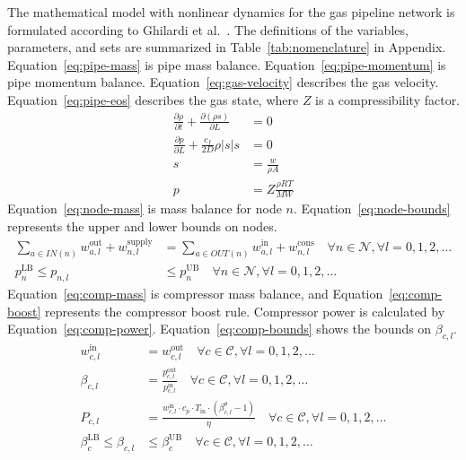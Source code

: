 \documentclass[11pt]{article}
\begin{document}
The mathematical model with nonlinear dynamics for the gas pipeline network is formulated according to Ghilardi et al.~\cite{GHILARDI2024}. The definitions of the variables, parameters, and sets are summarized in Table~\ref{tab:nomenclature} in Appendix. Equation~\eqref{eq:pipe-mass} is pipe mass balance. Equation~\eqref{eq:pipe-momentum} is pipe momentum balance. Equation~\eqref{eq:gas-velocity} describes the gas velocity. Equation~\eqref{eq:pipe-eos} describes the gas state, where $Z$ is a compressibility factor.
\begin{align}
\frac{\partial \rho}{\partial t} + \frac{\partial(\rho s)}{\partial L} &= 0 \label{eq:pipe-mass} \\
\frac{\partial p}{\partial L} + \frac{c_f}{2D}\rho|s|s &= 0 \label{eq:pipe-momentum} \\
s &= \frac{w}{\rho A} \label{eq:gas-velocity}\\
p &= Z\frac{\rho RT}{MW} \label{eq:pipe-eos}
\end{align}
Equation~\eqref{eq:node-mass} is mass balance for node $n$. Equation~\eqref{eq:node-bounds} represents the upper and lower bounds on nodes.
\begin{align}
\sum_{a \in IN(n)} w_{a,l}^{\text{out}} + w_{n,l}^{\text{supply}} &= \sum_{a \in OUT(n)} w_{a,l}^{\text{in}} + w_{n,l}^{\text{cons}}
\quad \forall n \in \mathcal{N}, \forall l = 0,1,2,\dots \label{eq:node-mass} \\
p_n^{\text{LB}} \leq p_{n,l} &\leq p_n^{\text{UB}} \quad \forall n \in \mathcal{N}, \forall l = 0,1,2,\dots \label{eq:node-bounds}
\end{align}
Equation~\eqref{eq:comp-mass} is compressor mass balance, and Equation~\eqref{eq:comp-boost} represents the compressor boost rule. Compressor power is calculated by Equation~\eqref{eq:comp-power}. Equation~\eqref{eq:comp-bounds} shows the bounds on $\beta_{c,l}$.
\begin{align}
w_{c,l}^{\text{in}} &= w_{c,l}^{\text{out}} \quad \forall c \in \mathcal{C}, \forall l = 0,1,2,\dots \label{eq:comp-mass} \\
\beta_{c,l} &= \frac{p_{c,l}^{\text{out}}}{p_{c,l}^{\text{in}}} \quad \forall c \in \mathcal{C}, \forall l = 0,1,2,\dots \label{eq:comp-boost} \\
P_{c,l} &= \frac{w_{c,l}^{\text{in}} \cdot c_p \cdot T_{\text{in}} \cdot (\beta_{c,l}^{\theta} - 1)}{\eta} \quad \forall c \in \mathcal{C}, \forall l = 0,1,2,\dots \label{eq:comp-power} \\
\beta_c^{\text{LB}} \leq \beta_{c,l} &\leq \beta_c^{\text{UB}} \quad \forall c \in \mathcal{C}, \forall l = 0,1,2,\dots \label{eq:comp-bounds}
\end{align}
\end{document}
